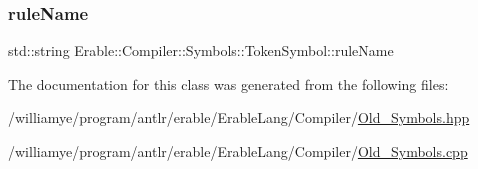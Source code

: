 \subsubsection{\texorpdfstring{ruleName}{ruleName}}
{\footnotesize\ttfamily std\+::string Erable\+::\+Compiler\+::\+Symbols\+::\+Token\+Symbol\+::rule\+Name}



The documentation for this class was generated from the following files\+:\begin{DoxyCompactItemize}
\item 
/williamye/program/antlr/erable/\+Erable\+Lang/\+Compiler/\mbox{\hyperlink{_old___symbols_8hpp}{Old\+\_\+\+Symbols.\+hpp}}\item 
/williamye/program/antlr/erable/\+Erable\+Lang/\+Compiler/\mbox{\hyperlink{_old___symbols_8cpp}{Old\+\_\+\+Symbols.\+cpp}}\end{DoxyCompactItemize}
